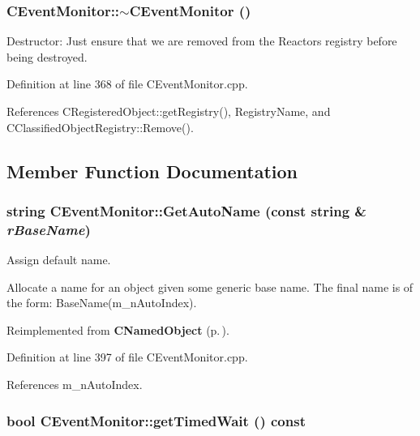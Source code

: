 \subsubsection{\setlength{\rightskip}{0pt plus 5cm}CEvent\-Monitor::$\sim$CEvent\-Monitor ()\hspace{0.3cm}{\tt  [virtual]}}\label{classCEventMonitor_a4}


Destructor: Just ensure that we are removed from the Reactors registry before being destroyed. 

Definition at line 368 of file CEvent\-Monitor.cpp.

References CRegistered\-Object::get\-Registry(), Registry\-Name, and CClassified\-Object\-Registry::Remove().

\subsection{Member Function Documentation}
\subsubsection{\setlength{\rightskip}{0pt plus 5cm}string CEvent\-Monitor::Get\-Auto\-Name (const string \& {\em r\-Base\-Name})\hspace{0.3cm}{\tt  [static, protected]}}\label{classCEventMonitor_e0}


Assign default name.

Allocate a name for an object given some generic base name.  The final name is of the form: Base\-Name(m\_\-n\-Auto\-Index). 

Reimplemented from {\bf CNamed\-Object} {\rm (p.\,\pageref{classCNamedObject_e0})}.

Definition at line 397 of file CEvent\-Monitor.cpp.

References m\_\-n\-Auto\-Index.
\subsubsection{\setlength{\rightskip}{0pt plus 5cm}bool CEvent\-Monitor::get\-Timed\-Wait () const\hspace{0.3cm}{\tt  [inline]}}\label{classCEventMonitor_a6}




